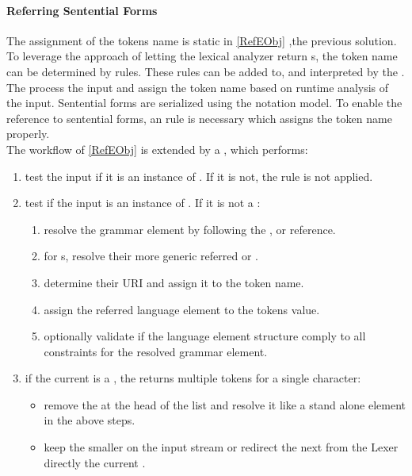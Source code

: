 \paragraph{Referring Sentential Forms}
The assignment of the tokens name is  static in \ref{RefEObj} ,the previous solution. To leverage the approach of letting the lexical analyzer return s, the token name can be determined by rules. These rules can be added to, and interpreted by the . The  process the input  and assign the token name based on runtime analysis of the input. Sentential forms are serialized using the notation model. To enable the reference to sentential forms, an  rule is necessary which assigns the token name properly. \\
The workflow of \ref{RefEObj} is extended by a , which performs:
\begin{enumerate}
	\item test the input  if it is an instance of . If it is not, the rule is not applied.
	\item test if the input is an instance of . 
	If it is not a :
	\begin{enumerate}
		\item resolve the grammar element by following the ,  or  reference. 
		\item for s, resolve their more generic referred  or .
		\item determine their URI and assign it to the token name.
		\item assign the referred language element  to the tokens value.
		\item optionally validate if the language element structure comply to all constraints for the resolved grammar element.
	\end{enumerate}
	\item if the current  is a , the  returns multiple tokens for a single character:
	\begin{itemize}
		\item remove the  at the head of the list and resolve it like a stand alone element in the above steps.
		\item keep the smaller  on the input stream or redirect the next  from the Lexer directly the current .  
	\end{itemize}
\end{enumerate}


